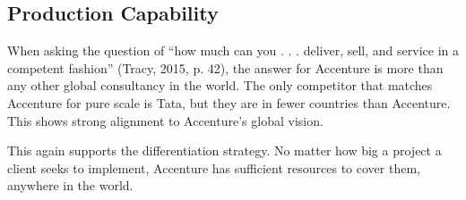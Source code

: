 \subsection{Production Capability}

When asking the question of ``how much can you . . . deliver, sell, and service in a competent fashion'' (Tracy, 2015, p. 42), the answer for Accenture is more than any other global consultancy in the world. The only competitor that matches Accenture for pure scale is Tata, but they are in fewer countries than Accenture. This shows strong alignment to Accenture's global vision.

This again supports the differentiation strategy. No matter how big a project a client seeks to implement, Accenture has sufficient resources to cover them, anywhere in the world.
